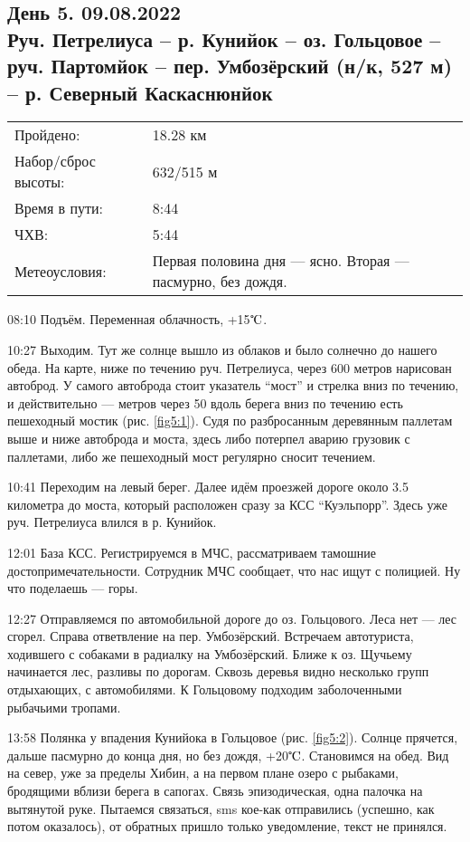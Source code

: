 \FloatBarrier

\subsection{День 5. 09.08.2022\\
Руч. Петрелиуса -- р. Кунийок -- оз. Гольцовое  -- руч. Партомйок -- пер. Умбозёрский (н/к, 527 м) -- р. Северный Каскаснюнйок}
\begin{tabular}{l p{12cm}}
\hline
Пройдено: & 18.28 км\\
Набор/сброс высоты: & 632/515 м\\
Время в пути: & 8:44\\
ЧХВ: & 5:44\\
Метеоусловия: & Первая половина дня --- ясно. Вторая --- пасмурно, без дождя.\\
\hline
\end{tabular}

08:10 Подъём. Переменная облачность, +15$\tccentigrade$.

10:27 Выходим.
Тут же солнце вышло из облаков и было солнечно до нашего обеда.
На карте, ниже по течению руч. Петрелиуса, через 600 метров нарисован автоброд.
У самого автоброда стоит указатель “мост” и стрелка вниз по течению, и действительно --- метров через 50 вдоль берега
вниз по течению есть пешеходный мостик (рис. \ref{fig5:1}). Судя по разбросанным деревянным паллетам выше и ниже автоброда и
моста, здесь либо потерпел аварию грузовик с паллетами, либо же пешеходный мост регулярно сносит течением.

10:41 Переходим на левый берег. Далее идём проезжей дороге около 3.5 километра до моста,
который расположен сразу за КСС “Куэльпорр”. Здесь уже руч. Петрелиуса влился в р. Кунийок.

12:01 База КСС. Регистрируемся в МЧС, рассматриваем тамошние достопримечательности.
Сотрудник МЧС сообщает, что нас ищут с полицией. Ну что поделаешь --- горы.

12:27 Отправляемся по автомобильной дороге до оз. Гольцового. Леса нет --- лес сгорел.
Справа ответвление на пер. Умбозёрский. Встречаем автотуриста, ходившего с собаками в радиалку на Умбозёрский.
Ближе к оз. Щучьему начинается лес, разливы по дорогам. Сквозь деревья видно несколько групп отдыхающих, с автомобилями.
К Гольцовому подходим заболоченными рыбачьими тропами.

13:58 Полянка у впадения Кунийока в Гольцовое (рис. \ref{fig5:2}). Солнце прячется, дальше пасмурно до конца дня,
но без дождя, +20$\tccentigrade$.
Становимся на обед. Вид на север, уже за пределы Хибин, а на первом плане озеро с рыбаками,
бродящими вблизи берега в сапогах. Связь эпизодическая, одна палочка на вытянутой руке. Пытаемся связаться,
sms кое-как отправились (успешно, как потом оказалось), от обратных пришло только уведомление, текст не принялся.

